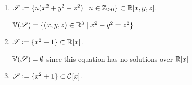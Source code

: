 \documentclass[Notebook.tex]{subfiles}
\begin{document}
\begin{solution}
\begin{enumerate}[label=(\alph*), ref=\theenumi\alph*]
\begin{enumerate}[label=(\roman*), ref=\theenumi\roman*]
            \item $\operatorname{\mathscr S} \coloneqq \{n(x^2+y^2-z^2) \; | \; n \in \mathbb Z_{\geq0} \} \subset \mathbb R[x,y,z]$.
            
            \bbni
            \begin{minipage}{0.5\textwidth}
            $\mathbb V(\operatorname{\mathscr S}) = \{(x,y,z) \in \mathbb R^3 \mid x^2 + y^2 = z^2\}$
            \end{minipage}
            \begin{minipage}{0.5\textwidth}
            \end{minipage}


            \item $\operatorname{\mathscr S} \coloneqq \{x^2 + 1 \} \subset \mathbb R[x]$.
            
            \bbni 
            $\mathbb V(\operatorname{\mathscr S}) = \emptyset$ since this equation has no solutions over $\mathbb R[x]$

            \item $\operatorname{\mathscr S} \coloneqq \{x^2 + 1\} \subset \mathcal{C}[x]$.
            

\end{enumerate}
\end{enumerate}
\end{solution}
\end{document}
